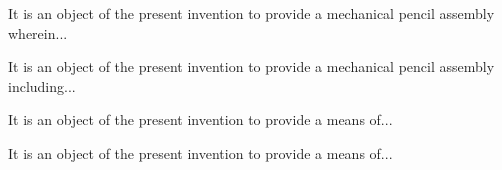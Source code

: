 
\pa
It is an object of the present invention to provide a mechanical pencil assembly wherein...

\pa
It is an object of the present invention to provide a mechanical pencil assembly including...

\pa
It is an object of the present invention to provide a means of...

\pa
It is an object of the present invention to provide a means of...


